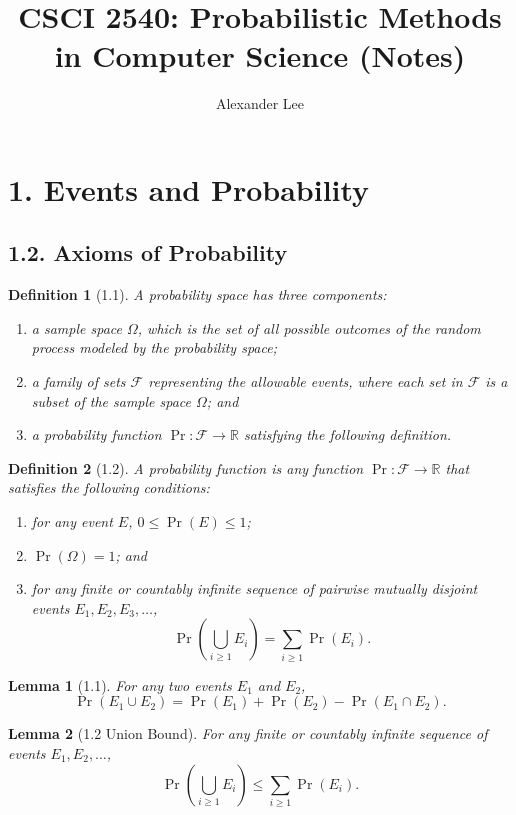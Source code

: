 \documentclass{amsart}
\title{CSCI 2540: Probabilistic Methods in Computer Science (Notes)}
\author{Alexander Lee}
\newtheorem*{definition}{Definition}
\newtheorem*{lemma}{Lemma}
\newcommand{\R}{\mathbb{R}}
\begin{document}
\maketitle

\section*{1. Events and Probability}

\subsection*{1.2. Axioms of Probability}

\begin{definition}[1.1]
  A probability space has three components:
  \begin{enumerate}
    \item a sample space $\Omega$, which is the set of all possible outcomes of
      the random process modeled by the probability space;
    \item a family of sets $\mathcal{F}$ representing the allowable events,
      where each set in $\mathcal{F}$ is a subset of the sample space $\Omega$;
      and
    \item a probability function $\Pr: \mathcal{F} \to \R$ satisfying the
      following definition.
  \end{enumerate}
\end{definition}

\begin{definition}[1.2]
  A probability function is any function $\Pr: \mathcal{F} \to \R$ that
  satisfies the following conditions:
  \begin{enumerate}
    \item for any event $E$, $0 \leq \Pr(E) \leq 1$;
    \item $\Pr(\Omega) = 1$; and
    \item for any finite or countably infinite sequence of pairwise mutually
      disjoint events $E_1, E_2, E_3, \ldots$,
      \[
        \Pr \left( \bigcup_{i \geq 1} E_i \right) = \sum_{i \geq 1} \Pr(E_i).
      \]
  \end{enumerate}
\end{definition}

\begin{lemma}[1.1]
  For any two events $E_1$ and $E_2$,
  \[
    \Pr(E_1 \cup E_2) = \Pr(E_1) + \Pr(E_2) - \Pr(E_1 \cap E_2).
  \]
\end{lemma}

\begin{lemma}[1.2 Union Bound]
  For any finite or countably infinite sequence of events $E_1, E_2, \ldots$,
  \[
    \Pr \left( \bigcup_{i \geq 1} E_i \right) \leq \sum_{i \geq 1} \Pr(E_i).
  \]
\end{lemma}
\end{document}
